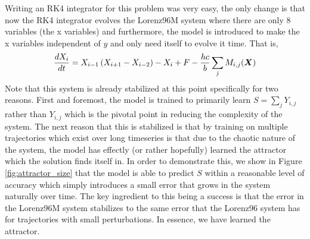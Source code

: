 \documentclass{article}
\begin{document}
\begin{enumerate}[label = \alph*).]
    Writing an RK4 integrator for this problem was very easy, the only
    change is that now the RK4 integrator evolves the Lorenz96M system where
    there are only 8 variables (the x variables) and furthermore, the model is
    introduced to make the x variables independent of $y$ and only need itself
    to evolve it time. That is, 
    \begin{gather*}
        \frac{d X_i}{d t} =X_{i-1}\left(X_{i+1}-X_{i-2}\right)-X_i + F
        -\frac{hc}{b}\sum_j M_{i,j}(\boldsymbol{X})
    \end{gather*}
    Note that this system is already stabilized at this point specifically
    for two reasons. First and foremost, the model is trained to primarily learn
    $S = \sum_j Y_{i,j}$ rather than $Y_{i,j}$ which is the pivotal point in
    reducing the complexity of the system. The next reason that this is
    stabilized is that by training on multiple trajectories which exist over
    long timeseries is that due to the chaotic nature of the system, the model
    has effectly (or rather hopefully) learned the attractor which the solution
    finds itself in. In order to demonstrate this, we show in Figure
    \ref{fig:attractor_size} that the model is able to predict $S$ within a
    reasonable level of accuracy which simply introduces a small error that
    grows in the system naturally over time. The key ingredient to this being a
    success is that the error in the Lorenz96M system stabilizes to the same
    error that the Lorenz96 system has for trajectories with small
    perturbations. In essence, we have learned the attractor. 


\end{enumerate}
\end{document}
